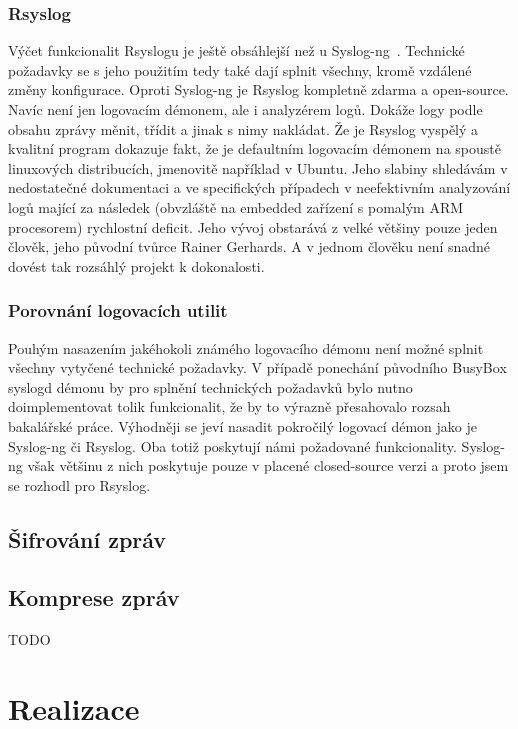 \documentclass[thesis=B,czech]{FITthesis}[2012/06/26]
\begin{document}
\subsection{Rsyslog}
Výčet funkcionalit Rsyslogu je ještě obsáhlejší než u Syslog-ng~\cite{Rsyslog-features}. Technické požadavky se s jeho použitím tedy také dají splnit všechny, kromě vzdálené změny konfigurace. Oproti Syslog-ng je Rsyslog kompletně zdarma a open-source. Navíc není jen logovacím démonem, ale i analyzérem logů. Dokáže logy podle obsahu zprávy měnit, třídit a jinak s nimy nakládat.
Že je Rsyslog vyspělý a kvalitní program dokazuje fakt, že je defaultním logovacím démonem na spoustě linuxových distribucích, jmenovitě například v Ubuntu.
Jeho slabiny shledávám v nedostatečné dokumentaci a ve specifických případech v neefektivním analyzování logů mající za následek (obvzláště na embedded zařízení s pomalým ARM procesorem) rychlostní deficit. Jeho vývoj obstarává z velké většiny pouze jeden člověk, jeho původní tvůrce Rainer Gerhards. A v jednom člověku není snadné dovést tak rozsáhlý projekt k dokonalosti.

\subsection{Porovnání logovacích utilit}
Pouhým nasazením jakéhokoli známého logovacího démonu není možné splnit všechny vytyčené technické požadavky. V případě ponechání původního BusyBox syslogd démonu by pro splnění technických požadavků bylo nutno doimplementovat tolik funkcionalit, že by to výrazně přesahovalo rozsah bakalářské práce.
Výhodněji se jeví nasadit pokročilý logovací démon jako je Syslog-ng či Rsyslog. Oba totiž poskytují námi požadované funkcionality. Syslog-ng však většinu z nich poskytuje pouze v placené closed-source verzi a proto jsem se rozhodl pro Rsyslog.

\section{Šifrování zpráv}



\section{Komprese zpráv}
TODO


\chapter{Realizace}
\end{document}
